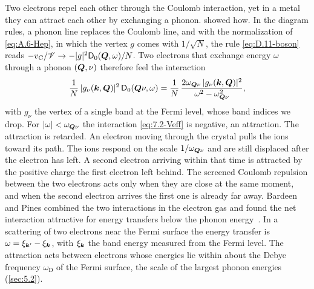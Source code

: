 Two electrons repel each other through the Coulomb interaction, yet in a metal they can attract each other by exchanging a phonon.  showed how. In the diagram rules, a phonon line replaces the Coulomb line, and with the normalization of \cref{eq:A.6-Hep}, in which the vertex $g$ comes with $1/\sqrt N$, the rule \cref{eq:D.11-boson} reads $-v_{\mathrm{C}}/\mathscr{V} \to -|g|^2\mathsf{D}_0(\bm{Q},\omega)/N$. Two electrons that exchange energy $\omega$ through a phonon $(\bm{Q},\nu)$ therefore feel the interaction
\begin{equation}
  \frac{1}{N}\,|g_\nu(\bm{k},\bm{Q})|^2\,\mathsf{D}_0(\bm{Q}\nu,\omega) = \frac{1}{N}\,\frac{2\omega_{\bm{Q}\nu}\,|g_\nu(\bm{k},\bm{Q})|^2}{\omega^2 - \omega_{\bm{Q}\nu}^2} ,
  \label{eq:7.2-Veff}
\end{equation}
with $g_\nu$ the vertex of a single band at the Fermi level, whose band indices we drop. For $|\omega| < \omega_{\bm{Q}\nu}$ the interaction \cref{eq:7.2-Veff} is negative, an attraction. The attraction is retarded. An electron moving through the crystal pulls the ions toward its path. The ions respond on the scale $1/\omega_{\bm{Q}\nu}$ and are still displaced after the electron has left. A second electron arriving within that time is attracted by the positive charge the first electron left behind. The screened Coulomb repulsion between the two electrons acts only when they are close at the same moment, and when the second electron arrives the first one is already far away. Bardeen and Pines combined the two interactions in the electron gas and found the net interaction attractive for energy transfers below the phonon energy~\cite{bardeen1955electron}. In a scattering of two electrons near the Fermi surface the energy transfer is $\omega = \xi_{\bm{k}'} - \xi_{\bm{k}}$, with $\xi_{\bm{k}}$ the band energy measured from the Fermi level. The attraction acts between electrons whose energies lie within about the Debye frequency $\omega_{\mathrm{D}}$ of the Fermi surface, the scale of the largest phonon energies (\cref{sec:5.2}).

